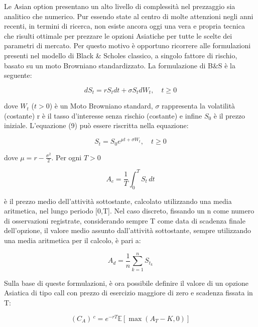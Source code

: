 \documentclass[12pt,a4paper]{report}
\begin{document}
Le Asian option presentano un alto livello di complessità nel prezzaggio sia analitico che numerico. Pur essendo state al centro di molte attenzioni negli anni recenti, in termini di ricerca, non esiste ancora oggi una vera e propria tecnica che risulti ottimale per prezzare le opzioni Asiatiche per tutte le scelte dei parametri di mercato. Per questo motivo è opportuno ricorrere alle formulazioni presenti nel modello di Black \& Scholes classico, a singolo fattore di rischio, basato su un moto Browniano standardizzato.
La formulazione di B\&S è la seguente:

\begin{equation}
    dS_t = rS_t dt + \sigma S_t dW_t, \quad t \geq 0
\end{equation}

dove $W_t$ ($t>0$) è un Moto Browniano standard, $\sigma$ rappresenta la volatilità (costante) r è il tasso d'interesse senza rischio (costante) e infine $S_0$ è il prezzo iniziale. L'equazione (9) può essere riscritta nella equazione:

\begin{equation}
    S_t = S_0 e^{\mu t + \sigma W_t}, \quad t \geq 0
\end{equation}

dove $\mu = r - \frac{\sigma^2}{2}$. Per ogni $T > 0$

\begin{equation}
    A_c = \frac{1}{T} \int_{0}^{T} S_t \, dt
\end{equation}

è il prezzo medio dell'attività sottostante, calcolato utilizzando una media aritmetica, nel lungo periodo [0,T].
Nel caso discreto, fissando un n come numero di osservazioni registrate, considerando sempre T come data di scadenza finale dell'opzione, il valore medio assunto dall'attività sottostante, sempre utilizzando una media aritmetica per il calcolo, è pari a:

\begin{equation}
    A_d = \frac{1}{n} \sum_{k=1}^{n} S_{t_{k}}
\end{equation}


Sulla base di queste formulazioni, è ora possibile definire il valore di un opzione Asiatica di tipo call con prezzo di esercizio maggiore di zero e scadenza fissata in T:

\begin{equation}
(C_A) \, ^c = e^{-rT}\mathbb{E}\left[\max(A_T - K, 0)\right]
\end{equation}
\end{document}
